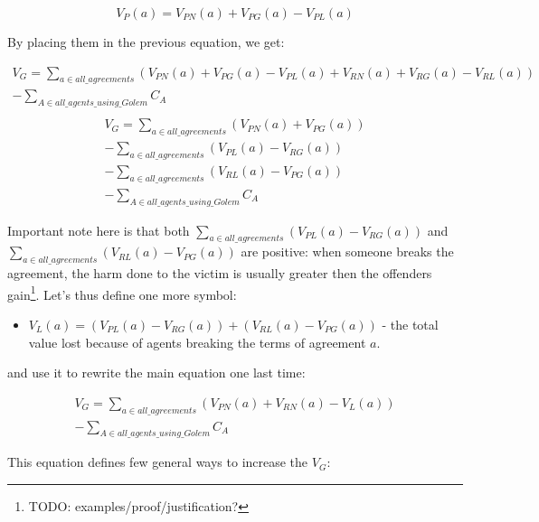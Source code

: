 \documentclass{article}
\begin{document}
\begin{equation}
    V_P(a) = V_{PN}(a) + V_{PG}(a) - V_{PL}(a)
\end{equation}

By placing them in the previous equation, we get:

\begin{equation}
\begin{split}
    V_G = \sum_{a \in all\_agreements}(V_{PN}(a) + V_{PG}(a) - V_{PL}(a) + V_{RN}(a) + V_{RG}(a) - V_{RL}(a)) \\
            - \sum_{A \in all\_agents\_using\_Golem}C_A \\
\end{split}
\end{equation}
\begin{equation}
\begin{split}
    V_G = \sum_{a \in all\_agreements}(V_{PN}(a) + V_{PG}(a)) \\
          - \sum_{a \in all\_agreements}(V_{PL}(a)- V_{RG}(a)) \\
          - \sum_{a \in all\_agreements}(V_{RL}(a)- V_{PG}(a)) \\
          - \sum_{A \in all\_agents\_using\_Golem}C_A
\end{split}
\end{equation}

Important note here is that both $\sum_{a \in all\_agreements}(V_{PL}(a)- V_{RG}(a))$ and $\sum_{a \in all\_agreements}(V_{RL}(a)- V_{PG}(a))$ are positive: 
when someone breaks the agreement, the harm done to the victim is usually greater then the offenders gain\footnote{TODO: examples/proof/justification?}.
Let's thus define one more symbol:
\begin{itemize}
\item{$V_L(a) = (V_{PL}(a)- V_{RG}(a)) + (V_{RL}(a)- V_{PG}(a))$ - the total value lost because of agents breaking the terms of agreement $a$.}
\end{itemize}
and use it to rewrite the main equation one last time:

\begin{equation}
\begin{split}
    V_G = \sum_{a \in all\_agreements}(V_{PN}(a) + V_{RN}(a) - V_L(a)) \\
          - \sum_{A \in all\_agents\_using\_Golem}C_A
\end{split}
\end{equation}

This equation defines few general ways to increase the $V_G$:
\end{document}
